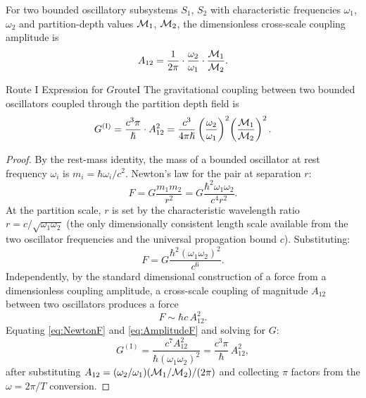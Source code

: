 \begin{definition}\label{def:A12}
For two bounded oscillatory subsystems $S_{1}$, $S_{2}$ with characteristic
frequencies $\omega_{1}$, $\omega_{2}$ and partition-depth values $\mathcal{M}_{1}$,
$\mathcal{M}_{2}$, the dimensionless cross-scale coupling amplitude is
\begin{equation}
  A_{12} = \frac{1}{2\pi}\cdot\frac{\omega_{2}}{\omega_{1}}\cdot\frac{\mathcal{M}_{1}}{\mathcal{M}_{2}}.
\end{equation}
\end{definition}

\begin{consequence}{Route I Expression for $G$}{routeI}
  The gravitational coupling between two bounded oscillators coupled through the
  partition depth field is
  \begin{equation}\label{eq:GrouteI}
    G^{(\mathrm{I})} = \frac{c^{3}\pi}{\hslash}\cdot A_{12}^{2}
    = \frac{c^{3}}{4\pi\hslash}\left(\frac{\omega_{2}}{\omega_{1}}\right)^{2}
      \!\left(\frac{\mathcal{M}_{1}}{\mathcal{M}_{2}}\right)^{2}.
  \end{equation}
\end{consequence}

\begin{proof}
By the rest-mass identity, the mass of a bounded oscillator at rest frequency
$\omega_{i}$ is $m_{i} = \hbar\omega_{i}/c^{2}$.
Newton's law for the pair at separation $r$:
\begin{equation}
  F = G\frac{m_{1}m_{2}}{r^{2}} = G\frac{\hbar^{2}\omega_{1}\omega_{2}}{c^{4}r^{2}}.
\end{equation}
At the partition scale, $r$ is set by the characteristic wavelength ratio
$r = c/\sqrt{\omega_{1}\omega_{2}}$ (the only dimensionally consistent length
scale available from the two oscillator frequencies and the universal
propagation bound $c$).
Substituting:
\begin{equation}
  F = G\frac{\hbar^{2}(\omega_{1}\omega_{2})^{2}}{c^{6}}.\label{eq:NewtonF}
\end{equation}
Independently, by the standard dimensional construction of a force from a
dimensionless coupling amplitude, a cross-scale coupling of magnitude $A_{12}$
between two oscillators produces a force
\begin{equation}
  F \sim \hbar c\, A_{12}^{2}.\label{eq:AmplitudeF}
\end{equation}
Equating \eqref{eq:NewtonF} and \eqref{eq:AmplitudeF} and solving for $G$:
\begin{equation}
  G^{(\mathrm{I})} = \frac{c^{7}A_{12}^{2}}{\hbar(\omega_{1}\omega_{2})^{2}}
                   = \frac{c^{3}\pi}{\hbar}\,A_{12}^{2},
\end{equation}
after substituting $A_{12} = (\omega_{2}/\omega_{1})(\mathcal{M}_{1}/\mathcal{M}_{2})/(2\pi)$
and collecting $\pi$ factors from the $\omega = 2\pi/T$ conversion.
\end{proof}

